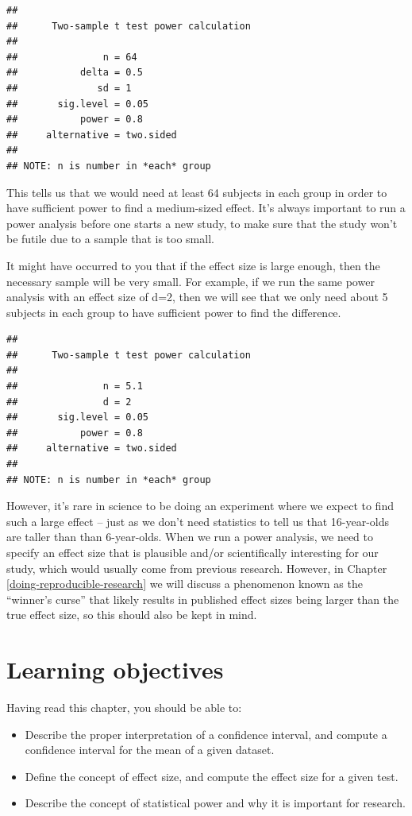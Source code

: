 \documentclass[
  12pt,
]{book}
\providecommand{\tightlist}{%
  \setlength{\itemsep}{0pt}\setlength{\parskip}{0pt}}
\begin{document}
\begin{verbatim}
## 
##      Two-sample t test power calculation 
## 
##               n = 64
##           delta = 0.5
##              sd = 1
##       sig.level = 0.05
##           power = 0.8
##     alternative = two.sided
## 
## NOTE: n is number in *each* group
\end{verbatim}

This tells us that we would need at least 64 subjects in each group in order to have sufficient power to find a medium-sized effect. It's always important to run a power analysis before one starts a new study, to make sure that the study won't be futile due to a sample that is too small.

It might have occurred to you that if the effect size is large enough, then the necessary sample will be very small. For example, if we run the same power analysis with an effect size of d=2, then we will see that we only need about 5 subjects in each group to have sufficient power to find the difference.

\begin{verbatim}
## 
##      Two-sample t test power calculation 
## 
##               n = 5.1
##               d = 2
##       sig.level = 0.05
##           power = 0.8
##     alternative = two.sided
## 
## NOTE: n is number in *each* group
\end{verbatim}

However, it's rare in science to be doing an experiment where we expect to find such a large effect -- just as we don't need statistics to tell us that 16-year-olds are taller than than 6-year-olds. When we run a power analysis, we need to specify an effect size that is plausible and/or scientifically interesting for our study, which would usually come from previous research. However, in Chapter \ref{doing-reproducible-research} we will discuss a phenomenon known as the ``winner's curse'' that likely results in published effect sizes being larger than the true effect size, so this should also be kept in mind.

\hypertarget{learning-objectives-9}{%
\section{Learning objectives}\label{learning-objectives-9}}

Having read this chapter, you should be able to:

\begin{itemize}
\tightlist
\item
  Describe the proper interpretation of a confidence interval, and compute a confidence interval for the mean of a given dataset.
\item
  Define the concept of effect size, and compute the effect size for a given test.
\item
  Describe the concept of statistical power and why it is important for research.
\end{itemize}
\end{document}
